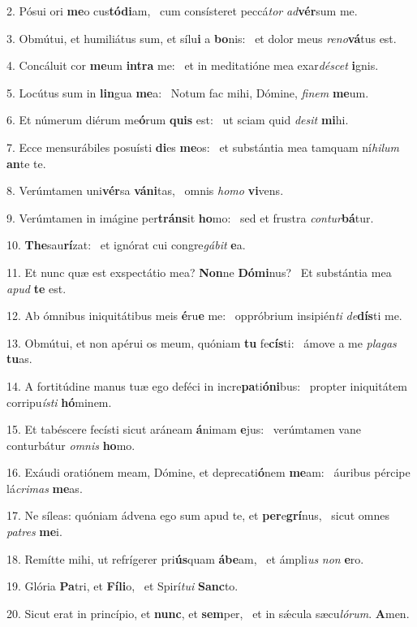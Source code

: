 2. Pósui ori \textbf{me}o cus\textbf{tó}\textbf{di}am, \ast\  cum consísteret peccá\textit{tor} \textit{ad}\textbf{vér}sum me.\

3. Obmútui, et humiliátus sum, et sílu\textbf{i} a \textbf{bo}nis: \ast\  et dolor meus \textit{re}\textit{no}\textbf{vá}tus est.\

4. Concáluit cor \textbf{me}um \textbf{in}\textbf{tra} me: \ast\  et in meditatióne mea exar\textit{dé}\textit{scet} \textbf{i}gnis.\

5. Locútus sum in \textbf{lin}gua \textbf{me}a: \ast\  Notum fac mihi, Dómine, \textit{fi}\textit{nem} \textbf{me}um.\

6. Et númerum diérum me\textbf{ó}rum \textbf{quis} est: \ast\  ut sciam quid \textit{de}\textit{sit} \textbf{mi}hi.\

7. Ecce mensurábiles posuísti \textbf{di}es \textbf{me}os: \ast\  et substántia mea tamquam ní\textit{hi}\textit{lum} \textbf{an}te te.\

8. Verúmtamen uni\textbf{vér}sa \textbf{vá}\textbf{ni}tas, \ast\  omnis \textit{ho}\textit{mo} \textbf{vi}vens.\

9. Verúmtamen in imágine per\textbf{tráns}it \textbf{ho}mo: \ast\  sed et frustra \textit{con}\textit{tur}\textbf{bá}tur.\

10. \textbf{The}sau\textbf{rí}zat: \ast\  et ignórat cui congre\textit{gá}\textit{bit} \textbf{e}a.\

11. Et nunc quæ est exspectátio mea? \textbf{Non}ne \textbf{Dó}\textbf{mi}nus? \ast\  Et substántia mea \textit{a}\textit{pud} \textbf{te} est.\

12. Ab ómnibus iniquitátibus meis \textbf{é}ru\textbf{e} me: \ast\  oppróbrium insipién\textit{ti} \textit{de}\textbf{dís}ti me.\

13. Obmútui, et non apérui os meum, quóniam \textbf{tu} fe\textbf{cís}ti: \ast\  ámove a me \textit{pla}\textit{gas} \textbf{tu}as.\

14. A fortitúdine manus tuæ ego deféci in incre\textbf{pa}ti\textbf{ó}\textbf{ni}bus: \ast\  propter iniquitátem corripu\textit{ís}\textit{ti} \textbf{hó}minem.\

15. Et tabéscere fecísti sicut aráneam \textbf{á}nimam \textbf{e}jus: \ast\  verúmtamen vane conturbátur \textit{om}\textit{nis} \textbf{ho}mo.\

16. Exáudi oratiónem meam, Dómine, et deprecati\textbf{ó}nem \textbf{me}am: \ast\  áuribus pércipe lá\textit{cri}\textit{mas} \textbf{me}as.\

17. Ne síleas: quóniam ádvena ego sum apud te, et \textbf{per}e\textbf{grí}nus, \ast\  sicut omnes \textit{pa}\textit{tres} \textbf{me}i.\

18. Remítte mihi, ut refrígerer pri\textbf{ús}quam \textbf{á}\textbf{be}am, \ast\  et ámpli\textit{us} \textit{non} \textbf{e}ro.\

19. Glória \textbf{Pa}tri, et \textbf{Fí}\textbf{li}o, \ast\  et Spirí\textit{tu}\textit{i} \textbf{Sanc}to.\

20. Sicut erat in princípio, et \textbf{nunc}, et \textbf{sem}per, \ast\  et in sǽcula sæcu\textit{ló}\textit{rum}. \textbf{A}men.\

